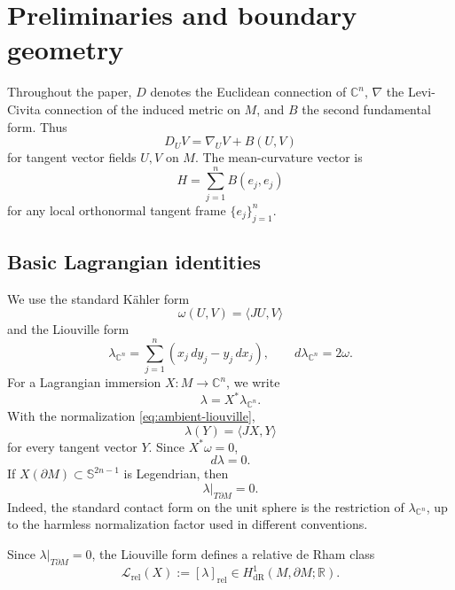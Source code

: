 \documentclass[11pt,a4paper]{article}
\numberwithin{equation}{section}
\newcommand{\C}{\mathbb C}
\newcommand{\Sph}{\mathbb S}
\begin{document}
\section{Preliminaries and boundary geometry}\label{sec:preliminaries}

Throughout the paper, $D$ denotes the Euclidean connection of $\C^n$, $\nabla$ the Levi-Civita connection of the induced metric on $M$, and $B$ the second fundamental form.  Thus
$$
        D_UV=\nabla_UV+B(U,V)
$$
for tangent vector fields $U,V$ on $M$.  The mean-curvature vector is
$$
        H=\sum_{j=1}^n B(e_j,e_j)
$$
for any local orthonormal tangent frame $\{e_j\}_{j=1}^n$.

\subsection{Basic Lagrangian identities}

We use the standard K\"ahler form
$$
        \omega(U,V)=\langle JU,V\rangle
$$
and the Liouville form
\begin{equation}\label{eq:ambient-liouville}
        \lambda_{\C^n}
        =\sum_{j=1}^n(x_j\,dy_j-y_j\,dx_j),
        \qquad
        d\lambda_{\C^n}=2\omega.
\end{equation}
For a Lagrangian immersion $X:M\to\C^n$, we write
\begin{equation}
        \lambda=X^*\lambda_{\C^n}.
\end{equation}
With the normalization \eqref{eq:ambient-liouville},
\begin{equation}\label{eq:lambda-evaluation}
        \lambda(Y)=\langle JX,Y\rangle
\end{equation}
for every tangent vector $Y$.  Since $X^*\omega=0$,
\begin{equation*}
        d\lambda=0.
\end{equation*}
If $X(\partial M)\subset\Sph^{2n-1}$ is Legendrian, then
\begin{equation}\label{eq:lambda-boundary-zero}
        \lambda|_{T\partial M}=0.
\end{equation}
Indeed, the standard contact form on the unit sphere is the restriction of $\lambda_{\C^n}$, up to the harmless normalization factor used in different conventions.

Since $\lambda|_{T\partial M}=0$, the Liouville form defines a relative
de Rham class \cite{GaoMaYao2026}
\[
        \mathcal L_{\mathrm{rel}}(X)
        :=[\lambda]_{\mathrm{rel}}
        \in H^1_{\mathrm{dR}}(M,\partial M;\mathbb R).
\]
\end{document}
